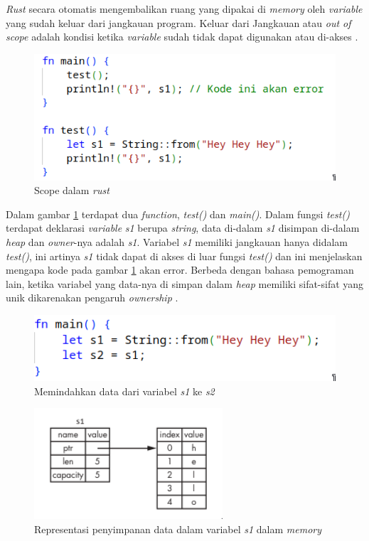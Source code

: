 \emph{Rust} secara otomatis mengembalikan ruang yang dipakai di \emph{memory} oleh \emph{variable} yang sudah keluar dari jangkauan program. Keluar dari Jangkauan atau \emph{out of scope} adalah kondisi ketika \emph{variable} sudah tidak dapat digunakan atau di-akses \citep{rustbook}.
\begin{figure}[H]
  \centering
	\includegraphics[keepaspectratio, width=12cm]{gambar/rust-scope.png}
  \caption{Scope dalam \emph{rust} \citep{rustbook}}
	\label{gambar:rust-scope}
\end{figure}

Dalam gambar \ref{gambar:rust-scope} terdapat dua \emph{function}, \emph{test()} dan \emph{main()}. Dalam fungsi \emph{test()} terdapat deklarasi \emph{variable} \emph{s1} berupa \emph{string}, data di-dalam \emph{s1} disimpan di-dalam \emph{heap} dan \emph{owner}-nya adalah \emph{s1}. Variabel \emph{s1} memiliki jangkauan hanya didalam \emph{test()}, ini artinya \emph{s1} tidak dapat di akses di luar fungsi \emph{test()} dan ini menjelaskan mengapa kode pada gambar \ref{gambar:rust-scope} akan error. Berbeda dengan bahasa pemograman lain, ketika variabel yang data-nya di simpan dalam \emph{heap} memiliki sifat-sifat yang unik dikarenakan pengaruh \emph{ownership} \citep{rustbook}.

\begin{figure}[H]
  \centering
	\includegraphics[keepaspectratio, width=12cm]{gambar/moving-data.png}
  \caption{Memindahkan data dari variabel \emph{s1} ke \emph{s2} \citep{rustbook}}
	\label{gambar:rust-data-transfer}
\end{figure}

\begin{figure}[H]
  \centering
	\includegraphics[keepaspectratio, width=7cm]{gambar/single-s1-memory.png}
  \caption{Representasi penyimpanan data dalam variabel \emph{s1} dalam \emph{memory} \citep{rustbook}}
	\label{gambar:single-memory-representation}
\end{figure}

